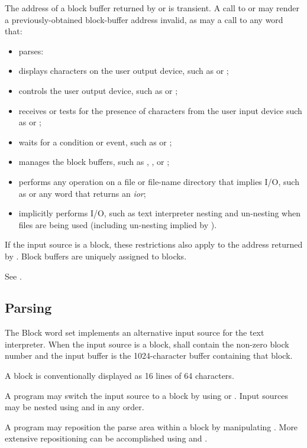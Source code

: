The address of a block buffer returned by  or
 is transient. A call to  or 
may render a previously-obtained block-buffer address invalid, as
may a call to any word that:
\begin{itemize}
\item parses:
\item displays characters on the user output device, such as
	 or ;
\item controls the user output device, such as  or
	;
\item receives or tests for the presence of characters from the
	user input device such as  or
	;
\item waits for a condition or event, such as 
	or ;
\item manages the block buffers, such as ,
	, or ;
\item performs any operation on a file or file-name directory
	that implies I/O, such as  or any word that
	returns an \emph{ior};
\item implicitly performs I/O, such as text interpreter nesting
	and un-nesting when files are being used (including un-nesting
	implied by ).
\end{itemize}

If the input source is a block, these restrictions also apply to
the address returned by . Block buffers are
uniquely assigned to blocks.

See .
\subsection{Parsing} %

The Block word set implements an alternative input source for the
text interpreter. When the input source is a block,  shall
contain the non-zero block number and the input buffer is the
1024-character buffer containing that block.

A block is conventionally displayed as 16 lines of 64 characters.

A program may switch the input source to a block by using
 or . Input sources may be nested using
 and  in any order.

A program may reposition the parse area within a block by
manipulating . More extensive repositioning can be
accomplished using  and
.

